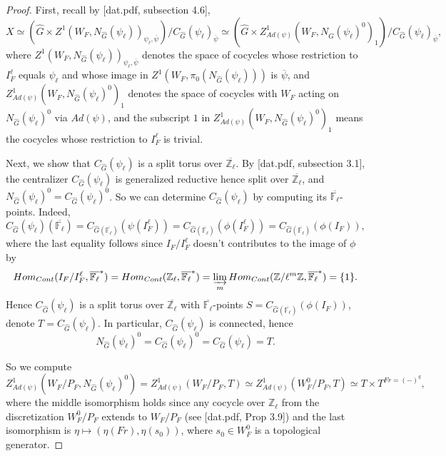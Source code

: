 \documentclass{article}
\begin{document}
	\begin{proof}
		
		
		First, recall by [dat.pdf, subsection 4.6], 
		$$X \simeq (\hat{G} \times Z^1(W_F, N_{\hat{G}}(\psi_{\ell}))_{\psi_{\ell}, \overline{\psi}})/C_{\hat{G}}(\psi_{\ell})_{\overline{\psi}} \simeq (\hat{G} \times Z^1_{Ad(\psi)}(W_F, N_{\hat{G}}(\psi_{\ell})^0)_1)/C_{\hat{G}}(\psi_{\ell})_{\overline{\psi}},$$
		where $Z^1(W_F, N_{\hat{G}}(\psi_{\ell}))_{\psi_{\ell}, \overline{\psi}}$ denotes the space of cocycles whose restriction to $I_F^\ell$ equals $\psi_{\ell}$ and whose image in $Z^1(W_F, \pi_0(N_{\hat{G}}(\psi_{\ell})))$ is $\overline{\psi}$, and $Z^1_{Ad(\psi)}(W_F, N_{\hat{G}}(\psi_{\ell})^0)_1$ denotes the space of cocycles with $W_F$ acting on $N_{\hat{G}}(\psi_{\ell})^0$ via $Ad(\psi)$, and the subscript $1$ in $Z^1_{Ad(\psi)}(W_F, N_{\hat{G}}(\psi_{\ell})^0)_1$ means the cocycles whose restriction to $I_F^\ell$ is trivial.
		
		
		Next, we show that $C_{\hat{G}}(\psi_{\ell})$ is a split torus over $\overline{\mathbb{Z}_\ell}$. By [dat.pdf, subsection 3.1], the centralizer $C_{\hat{G}}(\psi_{\ell})$ is generalized reductive hence split over $\overline{\mathbb{Z}_\ell}$, and $N_{\hat{G}}(\psi_{\ell})^0=C_{\hat{G}}(\psi_{\ell})^0$. So we can determine $C_{\hat{G}}(\psi_{\ell})$ by computing its $\overline{\mathbb{F}_\ell}$-points. Indeed, $$C_{\hat{G}}(\psi_{\ell})(\overline{\mathbb{F}_\ell})=C_{\hat{G}(\overline{\mathbb{F}_\ell})}(\psi(I_F^\ell))=C_{\hat{G}(\overline{\mathbb{F}_\ell})}(\phi(I_F^\ell))=C_{\hat{G}(\overline{\mathbb{F}_\ell})}(\phi(I_F)),$$
		where the last equality follows since $I_F/I_F^\ell$ doesn't contributes to the image of $\phi$ by 
		$$Hom_{Cont}(I_F/I_F^\ell, \overline{\mathbb{F}_\ell}^*)=Hom_{Cont}(\mathbb{Z}_\ell, \overline{\mathbb{F}_\ell}^*)=\varinjlim_mHom_{Cont}(\mathbb{Z}/\ell^m\mathbb{Z}, \overline{\mathbb{F}_\ell}^*)=\{1\}.$$ Hence $C_{\hat{G}}(\psi_{\ell})$ is a split torus over $\overline{\mathbb{Z}_\ell}$ with $\overline{\mathbb{F}_\ell}$-points $S=C_{\hat{G}(\overline{\mathbb{F}_\ell})}(\phi(I_F))$, denote $T=C_{\hat{G}}(\psi_{\ell})$. In particular, $C_{\hat{G}}(\psi_{\ell})$ is connected, hence 
		$$N_{\hat{G}}(\psi_{\ell})^0=C_{\hat{G}}(\psi_{\ell})^0=C_{\hat{G}}(\psi_{\ell})=T.$$
		
		So we compute
		$$Z^1_{Ad(\psi)}(W_F/P_F, N_{\hat{G}}(\psi_{\ell})^0)=Z^1_{Ad(\psi)}(W_F/P_F, T) \simeq Z^1_{Ad(\psi)}(W_F^0/P_F, T) \simeq T \times T^{Fr=(-)^q},$$
		where the middle isomorphism holds since any cocycle over $\mathbb{Z}_\ell$ from the discretization $W_F^0/P_F$ extends to $W_F/P_F$ (see [dat.pdf, Prop 3.9]) and the last isomorphism is $\eta \mapsto (\eta(Fr), \eta(s_0))$, where $s_0 \in W_F^0$ is a topological generator.
		

\end{proof}
\end{document}
